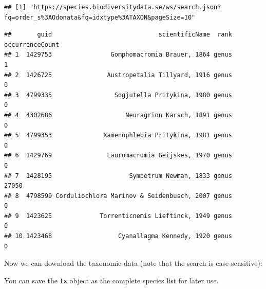 \documentclass[
  10pt,
]{article}
\newenvironment{Shaded}{\begin{snugshade}}{\end{snugshade}}
\newcommand{\AttributeTok}[1]{\textcolor[rgb]{0.77,0.63,0.00}{#1}}
\newcommand{\ConstantTok}[1]{\textcolor[rgb]{0.00,0.00,0.00}{#1}}
\newcommand{\DocumentationTok}[1]{\textcolor[rgb]{0.56,0.35,0.01}{\textbf{\textit{#1}}}}
\newcommand{\FunctionTok}[1]{\textcolor[rgb]{0.00,0.00,0.00}{#1}}
\newcommand{\NormalTok}[1]{#1}
\newcommand{\OtherTok}[1]{\textcolor[rgb]{0.56,0.35,0.01}{#1}}
\newcommand{\SpecialCharTok}[1]{\textcolor[rgb]{0.00,0.00,0.00}{#1}}
\newcommand{\StringTok}[1]{\textcolor[rgb]{0.31,0.60,0.02}{#1}}
\begin{document}
\begin{verbatim}
## [1] "https://species.biodiversitydata.se/ws/search.json?fq=order_s%3AOdonata&fq=idxtype%3ATAXON&pageSize=10"
\end{verbatim}

\begin{verbatim}
##       guid                             scientificName  rank occurrenceCount
## 1  1429753                Gomphomacromia Brauer, 1864 genus               1
## 2  1426725               Austropetalia Tillyard, 1916 genus               0
## 3  4799335                 Sogjutella Pritykina, 1980 genus               0
## 4  4302686                    Neuragrion Karsch, 1891 genus               0
## 5  4799353              Xamenophlebia Pritykina, 1981 genus               0
## 6  1429769               Lauromacromia Geijskes, 1970 genus               0
## 7  1428195                     Sympetrum Newman, 1833 genus           27050
## 8  4798599 Corduliochlora Marinov & Seidenbusch, 2007 genus               0
## 9  1423625             Torrenticnemis Lieftinck, 1949 genus               0
## 10 1423468                  Cyanallagma Kennedy, 1920 genus               0
\end{verbatim}

Now we can download the taxonomic data (note that the search is case-sensitive):

\begin{Shaded}
\end{Shaded}

You can save the \texttt{tx} object as the complete species list for later use.
\end{document}
